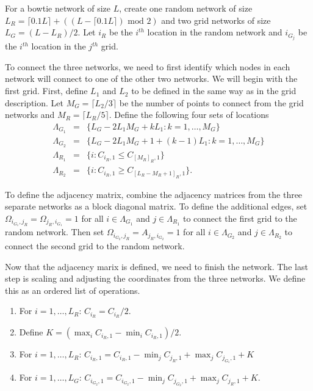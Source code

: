 \documentclass[11pt]{article}
\begin{document}
For a bowtie network of size $L$, create one random network of size
$L_R = \lceil 0.1 L \rceil + ((L - \lceil 0.1 L \rceil) \text{ mod }
    2)$ and two grid networks of size $L_G = (L - L_R)/2$.  Let $i_{R}$ be
the $i^{th}$ location in the random network and $i_{G_j}$ be the
$i^{th}$ location in the $j^{th}$ grid.

To connect the three networks, we need to first identify which nodes
in each network will connect to one of the other two networks.  We
will begin with the first grid.  First, define $L_1$ and $L_2$ to be
defined in the same way as in the grid description.  Let $M_{G} =
    \lceil L_2/3 \rceil$ be the number of points to connect from the grid
networks and $M_{R} = \lceil L_R/5 \rceil$.  Define the following four
sets of locations
\begin{equation*}
\begin{array}{rcl}
\Lambda_{G_1} & = & \lbrace L_G -
2L_1M_G + kL_1 : k = 1,\ldots,M_G\rbrace\\
\Lambda_{G_2} & = & \lbrace L_G -
2L_1M_G + 1 + (k-1)L_1 : k =
1,\ldots,M_G\rbrace\\
\Lambda_{R_1} & = & \lbrace i : C_{i_R,1} \le C_{[M_R]_{R},1} \rbrace\\
\Lambda_{R_2} & = & \lbrace i : C_{i_R,1} \ge C_{[L_R - M_R + 1]_{R},1} \rbrace.
\end{array}
\end{equation*}

To define the adjacency matrix, combine the adjacency matrices from
the three separate networks as a block diagonal matrix.  To define the
additional edges, set $\Omega_{i_{G_1},j_R} = \Omega_{j_R,i_{G_1}} =
    1$ for all $i \in \Lambda_{G_1}$ and $j \in \Lambda_{R_1}$ to connect
the first grid to the random network.  Then set $\Omega_{i_{G_2},j_R}
    = A_{j_R,i_{G_2}} = 1$ for all $i \in \Lambda_{G_2}$ and $j \in
    \Lambda_{R_2}$ to connect the second grid to the random network.

Now that the adjacency marix is defined, we need to finish the
network.  The last step is scaling and adjusting the coordinates from
the three networks.  We define this as an ordered list of operations.
\begin{enumerate}
\item For $i=1,\ldots,L_R$: $C_{i_{R}} = C_{i_{R}}/2$.
\item Define $K = (\max_i C_{i_{R},1} - \min_i C_{i_{R},1})/2$.
\item For $i=1,\ldots,L_R$: $C_{i_{R},1} = C_{i_{R},1} -
\min_j C_{j_{R},1} + \max_j C_{j_{G_1},1} + K$
\item For $i=1,\ldots,L_G$:
$C_{i_{G_2},1} = C_{i_{G_2},1} - \min_j C_{j_{G_2},1} + \max_j
C_{j_{R},1} + K$.
\end{enumerate}
\end{document}
